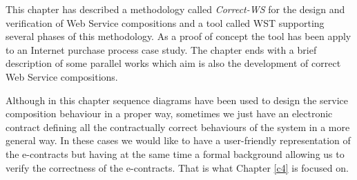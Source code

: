 This chapter has described a methodology called \textit{Correct-WS} for the design and verification of Web Service compositions and a tool called WST supporting several phases of this methodology. As a proof of concept the tool has been apply to an Internet purchase process case study. The chapter ends with a brief description of some parallel works which aim is also the development of correct Web Service compositions.

Although in this chapter sequence diagrams have been used to design the service composition behaviour in a proper way, sometimes we just have an electronic contract defining all the contractually correct behaviours of the system in a more general way. In these cases we would like to have a user-friendly representation of the e-contracts but having at the same time a formal background allowing us to verify the correctness of the e-contracts. That is what Chapter \ref{c4} is focused on.
